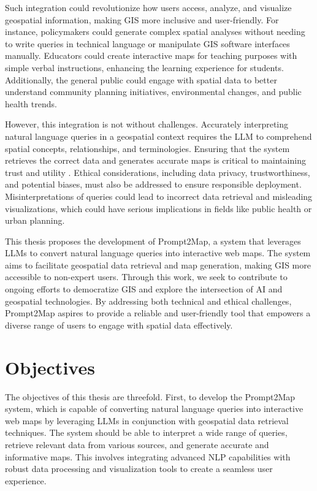 Such integration could revolutionize how users access, analyze, and visualize geospatial information, making GIS more inclusive and user-friendly. For instance, policymakers could generate complex spatial analyses without needing to write queries in technical language or manipulate GIS software interfaces manually. Educators could create interactive maps for teaching purposes with simple verbal instructions, enhancing the learning experience for students. Additionally, the general public could engage with spatial data to better understand community planning initiatives, environmental changes, and public health trends.

However, this integration is not without challenges. Accurately interpreting natural language queries in a geospatial context requires the LLM to comprehend spatial concepts, relationships, and terminologies. Ensuring that the system retrieves the correct data and generates accurate maps is critical to maintaining trust and utility \cite{zhang_ethics_2023}. Ethical considerations, including data privacy, trustworthiness, and potential biases, must also be addressed to ensure responsible deployment. Misinterpretations of queries could lead to incorrect data retrieval and misleading visualizations, which could have serious implications in fields like public health or urban planning.

This thesis proposes the development of Prompt2Map, a system that leverages LLMs to convert natural language queries into interactive web maps. The system aims to facilitate geospatial data retrieval and map generation, making GIS more accessible to non-expert users. Through this work, we seek to contribute to ongoing efforts to democratize GIS and explore the intersection of AI and geospatial technologies. By addressing both technical and ethical challenges, Prompt2Map aspires to provide a reliable and user-friendly tool that empowers a diverse range of users to engage with spatial data effectively.

\section{Objectives}

The objectives of this thesis are threefold. First, to develop the Prompt2Map system, which is capable of converting natural language queries into interactive web maps by leveraging LLMs in conjunction with geospatial data retrieval techniques. The system should be able to interpret a wide range of queries, retrieve relevant data from various sources, and generate accurate and informative maps. This involves integrating advanced NLP capabilities with robust data processing and visualization tools to create a seamless user experience.


